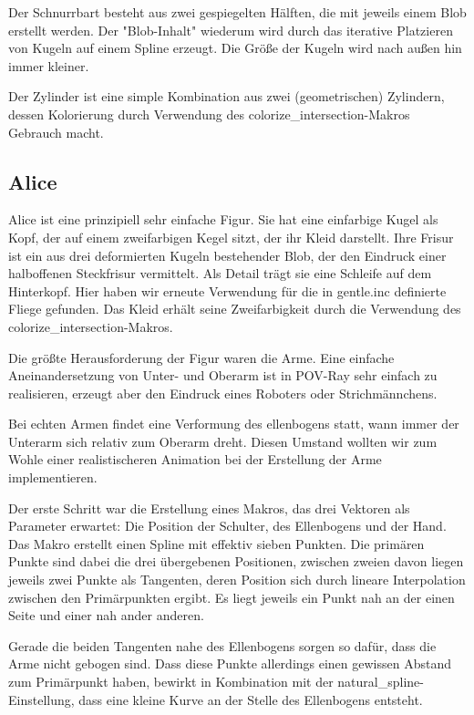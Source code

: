 \documentclass[twocolumn]{article}
\begin{document}
Der Schnurrbart besteht aus zwei gespiegelten Hälften, die mit jeweils einem Blob erstellt werden.
Der "Blob-Inhalt" wiederum wird durch das iterative Platzieren von Kugeln auf einem Spline erzeugt.
Die Größe der Kugeln wird nach außen hin immer kleiner.

Der Zylinder ist eine simple Kombination aus zwei (geometrischen) Zylindern, dessen Kolorierung durch Verwendung des colorize\_intersection-Makros Gebrauch macht.

\subsection{Alice}
Alice ist eine prinzipiell sehr einfache Figur. Sie hat eine einfarbige Kugel als Kopf, der auf einem zweifarbigen Kegel sitzt, der ihr Kleid darstellt.
Ihre Frisur ist ein aus drei deformierten Kugeln bestehender Blob, der den Eindruck einer halboffenen Steckfrisur vermittelt.
Als Detail trägt sie eine Schleife auf dem Hinterkopf. Hier haben wir erneute Verwendung für die in gentle.inc definierte Fliege gefunden.
Das Kleid erhält seine Zweifarbigkeit durch die Verwendung des colorize\_intersection-Makros.

Die größte Herausforderung der Figur waren die Arme.
Eine einfache Aneinandersetzung von Unter- und Oberarm ist in POV-Ray sehr einfach zu realisieren, erzeugt aber den Eindruck eines Roboters oder Strichmännchens.

Bei echten Armen findet eine Verformung des ellenbogens statt, wann immer der Unterarm sich relativ zum Oberarm dreht.
Diesen Umstand wollten wir zum Wohle einer realistischeren Animation bei der Erstellung der Arme implementieren.

Der erste Schritt war die Erstellung eines Makros, das drei Vektoren als Parameter erwartet: Die Position der Schulter, des Ellenbogens und der Hand.
Das Makro erstellt einen Spline mit effektiv sieben Punkten.
Die primären Punkte sind dabei die drei übergebenen Positionen, zwischen zweien davon liegen jeweils zwei Punkte als Tangenten, deren Position sich durch lineare Interpolation zwischen den Primärpunkten ergibt. Es liegt jeweils ein Punkt nah an der einen Seite und einer nah ander anderen.

Gerade die beiden Tangenten nahe des Ellenbogens sorgen so dafür, dass die Arme nicht gebogen sind. Dass diese Punkte allerdings einen gewissen Abstand zum Primärpunkt haben, bewirkt in Kombination mit der natural\_spline-Einstellung, dass eine kleine Kurve an der Stelle des Ellenbogens entsteht.
\end{document}
